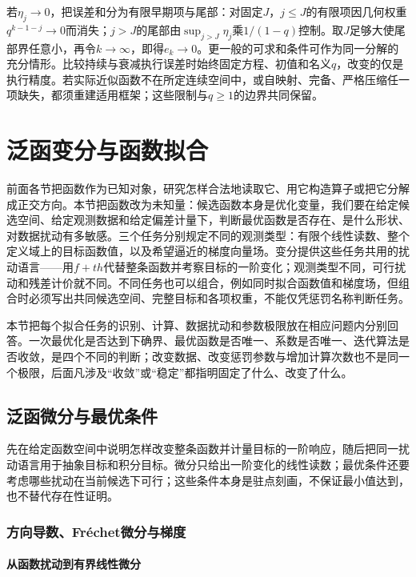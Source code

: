 若$\eta_j\to0$，把误差和分为有限早期项与尾部：对固定$J$，$j\le J$的有限项因几何权重$q^{k-1-j}\to0$而消失；$j>J$的尾部由$\sup_{j>J}\eta_j$乘$1/(1-q)$控制。取$J$足够大使尾部界任意小，再令$k\to\infty$，即得$e_k\to0$。更一般的可求和条件可作为同一分解的充分情形。比较持续与衰减执行误差时始终固定方程、初值和名义$q$，改变的仅是执行精度。若实际近似函数不在所定连续空间中，或自映射、完备、严格压缩任一项缺失，都须重建适用框架；这些限制与$q\ge1$的边界共同保留。
\section{泛函变分与函数拟合}
\label{sec:variational-functional-fitting}

前面各节把函数作为已知对象，研究怎样合法地读取它、用它构造算子或把它分解成正交方向。本节把函数改为未知量：候选函数本身是优化变量，我们要在给定候选空间、给定观测数据和给定偏差计量下，判断最优函数是否存在、是什么形状、对数据扰动有多敏感。三个任务分别规定不同的观测类型：有限个线性读数、整个定义域上的目标函数值，以及希望逼近的梯度向量场。变分提供这些任务共用的扰动语言——用$f+th$代替整条函数并考察目标的一阶变化；观测类型不同，可行扰动和残差计价就不同。不同任务也可以组合，例如同时拟合函数值和梯度场，但组合时必须写出共同候选空间、完整目标和各项权重，不能仅凭惩罚名称判断任务。

本节把每个拟合任务的识别、计算、数据扰动和参数极限放在相应问题内分别回答。一次最优化是否达到下确界、最优函数是否唯一、系数是否唯一、迭代算法是否收敛，是四个不同的判断；改变数据、改变惩罚参数与增加计算次数也不是同一个极限，后面凡涉及“收敛”或“稳定”都指明固定了什么、改变了什么。

\subsection{泛函微分与最优条件}
\label{subsec:functional-differential-optimality}

先在给定函数空间中说明怎样改变整条函数并计量目标的一阶响应，随后把同一扰动语言用于抽象目标和积分目标。微分只给出一阶变化的线性读数；最优条件还要考虑哪些扰动在当前候选下可行；这些条件本身是驻点刻画，不保证最小值达到，也不替代存在性证明。

\subsubsection{方向导数、Fréchet微分与梯度}
\label{subsubsec:frechet-gradient}

\paragraph{从函数扰动到有界线性微分}

